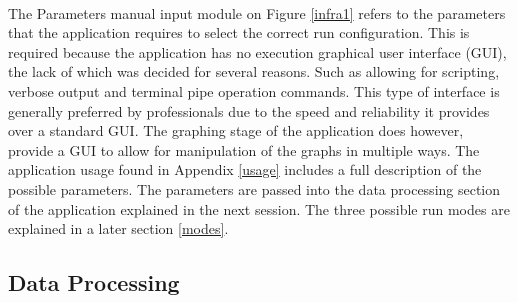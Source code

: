 \paragraph{}The Parameters manual input module on Figure \ref{infra1} refers to the parameters that the application requires to select the correct run configuration. This is required because the application has no execution graphical user interface (GUI), the lack of which was decided for several reasons. Such as allowing for scripting, verbose output and terminal pipe operation commands. This type of interface is generally preferred by professionals due to the speed and reliability it provides over a standard GUI. The graphing stage of the application does however, provide a GUI to allow for manipulation of the graphs in multiple ways. The application usage found in Appendix \ref{usage} includes a full description of the possible parameters. The parameters are passed into the data processing section of the application explained in the next session. The three possible run modes are explained in a later section \ref{modes}.

\subsection{Data Processing}
\label{infra2}

